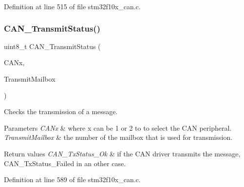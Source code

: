 Definition at line 515 of file stm32f10x\+\_\+can.\+c.

\mbox{\label{group___c_a_n___private___functions_ga68ab05a0a6cdfcc2b6f6b6b2c10848e2}} 
\subsubsection{\texorpdfstring{C\+A\+N\+\_\+\+Transmit\+Status()}{CAN\_TransmitStatus()}}
{\footnotesize\ttfamily uint8\+\_\+t C\+A\+N\+\_\+\+Transmit\+Status (\begin{DoxyParamCaption}\item[{\hyperlink{struct_c_a_n___type_def}{C\+A\+N\+\_\+\+Type\+Def} $\ast$}]{C\+A\+Nx,  }\item[{uint8\+\_\+t}]{Transmit\+Mailbox }\end{DoxyParamCaption})}



Checks the transmission of a message. 


\begin{DoxyParams}{Parameters}
{\em C\+A\+Nx} & where x can be 1 or 2 to to select the C\+AN peripheral. \\
\hline
{\em Transmit\+Mailbox} & the number of the mailbox that is used for transmission. \\
\hline
\end{DoxyParams}

\begin{DoxyRetVals}{Return values}
{\em C\+A\+N\+\_\+\+Tx\+Status\+\_\+\+Ok} & if the C\+AN driver transmits the message, C\+A\+N\+\_\+\+Tx\+Status\+\_\+\+Failed in an other case. \\
\hline
\end{DoxyRetVals}


Definition at line 589 of file stm32f10x\+\_\+can.\+c.

\mbox{\label{group___c_a_n___private___functions_ga94740177bab153ca5b102d122f9a8cca}} 
